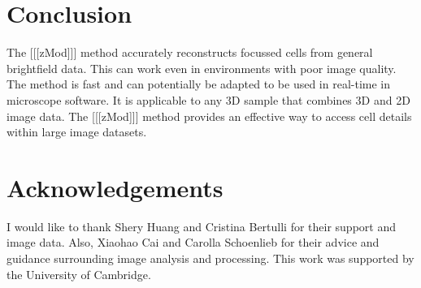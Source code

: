 \documentclass[preprint,11pt,5p,twocolumn]{elsarticle}
\begin{document}
\section{Conclusion}

The [[[zMod]]] method accurately reconstructs focussed cells from general brightfield data. This can work even in environments with poor image quality. The method is fast and can potentially be adapted to be used in real-time in microscope software. It is applicable to any 3D sample that combines 3D and 2D image data. The [[[zMod]]] method provides an effective way to access cell details within large image datasets.

\section{Acknowledgements}

I would like to thank Shery Huang and Cristina Bertulli for their support and image data. Also, Xiaohao Cai and Carolla Schoenlieb for their advice and guidance surrounding image analysis and processing. This work was supported by the University of Cambridge.






% 






\end{document}
